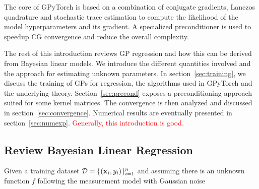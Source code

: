 \documentclass{article}
\begin{document}
The core of GPyTorch is based on a combination of conjugate gradients, Lanczos quadrature and stochastic trace estimation to compute the likelihood of the model hyperparameters and its gradient. A specialized preconditioner is used to speedup CG convergence and reduce the overall complexity.

The rest of this introduction reviews GP regression and how this can be derived from Bayesian linear models. We introduce the different quantities involved and the approach for estimating unknown parameters. In section~\ref{sec:training}, we discuss the training of GPs for regression, the algorithms used in GPyTorch and the underlying theory. Section~\ref{sec:precond} exposes a preconditioning approach suited for some kernel matrices. The convergence is then analyzed and discussed in section~\ref{sec:convergence}. Numerical results are eventually presented in section~\ref{sec:numexp}.
\textcolor{red}{Generally, this introduction is good.}




\subsection{Review Bayesian Linear Regression}

Given a training dataset $\mathcal D = \{(\boldsymbol{\mathbf{x}}_i, y_i)\}_{i=1}^n$ and assuming there is an unknown function $f$ following the measurement model with Gaussian noise
\end{document}
